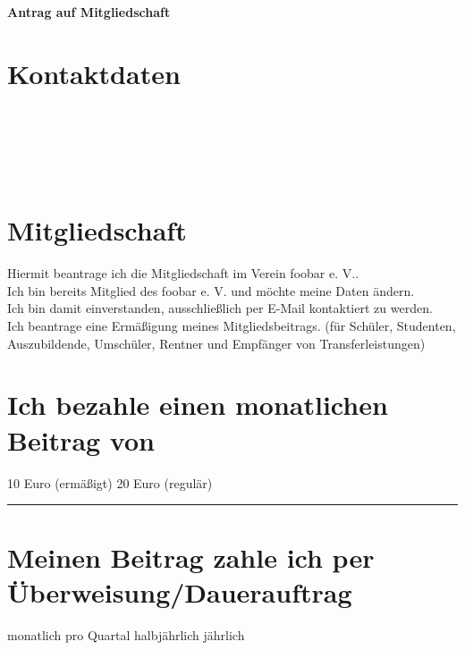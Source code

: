 

\pagestyle{empty}


\begin{Form}
\noindent\textbf{\Huge Antrag auf Mitgliedschaft}\\
\section*{Kontaktdaten}
\\[3mm]
\\[3mm]
\\[3mm]
\\[3mm]

\section*{Mitgliedschaft}
\CheckBox[name=1,bordercolor=black]{} Hiermit beantrage ich die Mitgliedschaft im Verein foobar e. V..\\[1mm]
\CheckBox[name=2,bordercolor=black]{} Ich bin bereits Mitglied des foobar e. V. und möchte meine Daten ändern.\\[1mm]
\CheckBox[name=3,bordercolor=black]{} Ich bin damit einverstanden, ausschließlich per E-Mail kontaktiert zu werden.\\[1mm]
\CheckBox[name=4,bordercolor=black]{} Ich beantrage eine Ermäßigung meines Mitgliedsbeitrags. (für Schüler, Studenten, Auszubildende, Umschüler, Rentner und Empfänger von Transferleistungen)

\section*{Ich bezahle einen monatlichen Beitrag von}
\CheckBox[name=5,bordercolor=black]{} 10 Euro (ermäßigt)\qquad
\CheckBox[name=7,bordercolor=black]{} 20 Euro (regulär)\qquad
\CheckBox[name=6,bordercolor=black]{} \noindent\rule{30mm}{0.4pt}

\section*{Meinen Beitrag zahle ich per Überweisung/Dauerauftrag}
\CheckBox[name=8,bordercolor=black]{} monatlich\qquad
\CheckBox[name=9,bordercolor=black]{} pro Quartal\qquad
\CheckBox[name=10,bordercolor=black]{} halbjährlich\qquad
\CheckBox[name=11,bordercolor=black]{} jährlich


\end{Form}
